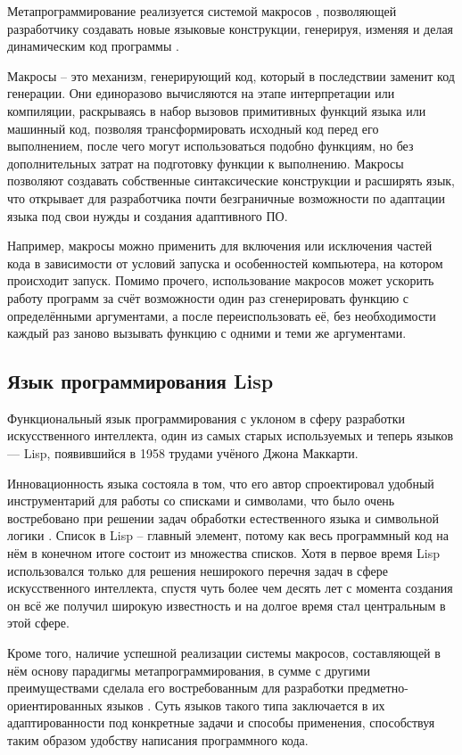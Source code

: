 Метапрограммирование реализуется системой макросов \cite{e6}, позволяющей разработчику создавать новые языковые конструкции, генерируя, изменяя и делая динамическим код программы .

Макросы -- это механизм, генерирующий код, который в последствии заменит код генерации. Они единоразово вычисляются на этапе интерпретации или компиляции, раскрываясь в набор вызовов примитивных функций языка или машинный код, позволяя трансформировать исходный код перед его выполнением, после чего могут использоваться подобно функциям, но без дополнительных затрат на подготовку функции к выполнению. Макросы позволяют создавать собственные синтаксические конструкции и расширять язык, что открывает для разработчика почти безграничные возможности по адаптации языка под свои нужды и создания адаптивного ПО.

Например, макросы можно применить для включения или исключения частей кода в зависимости от условий запуска и особенностей компьютера, на котором происходит запуск. Помимо прочего, использование макросов может ускорить работу программ за счёт возможности один раз сгенерировать функцию с определёнными аргументами, а после переиспользовать её, без необходимости каждый раз заново вызывать функцию с одними и теми же аргументами.

\subsection{Язык программирования Lisp}

Функциональный язык программирования с уклоном в сферу разработки искусственного интеллекта, один из самых старых используемых и теперь языков — Lisp, появившийся в 1958 трудами учёного Джона Маккарти.

Инновационность языка состояла в том, что его автор спроектировал удобный инструментарий для работы со списками и символами, что было очень востребовано при решении задач обработки естественного языка и символьной логики \cite{e1}. Список в Lisp -- главный элемент, потому как весь программный код на нём в конечном итоге состоит из множества списков. Хотя в первое время Lisp использовался только для решения неширокого перечня задач в сфере искусственного интеллекта, спустя чуть более чем десять лет с момента создания он всё же получил широкую известность и на долгое время стал центральным в этой сфере.

Кроме того, наличие успешной реализации системы макросов, составляющей в нём основу парадигмы метапрограммирования, в сумме с другими преимуществами сделала его востребованным для разработки предметно-ориентированных языков \cite{e11}. Суть языков такого типа заключается в их адаптированности под конкретные задачи и способы применения, способствуя таким образом удобству написания программного кода.

